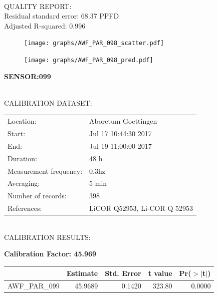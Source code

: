 \documentclass[oneside]{report}
\begin{document}
\hrulefill\\
QUALITY REPORT:\\
Residual standard error: 68.37 PPFD\\
Adjusted R-squared: 0.996



\begin{figure}[H]
  \centering
  \texttt{[image: graphs/AWF\_PAR\_098\_scatter.pdf]}
\end{figure}




\begin{figure}[H]
  \centering
  \texttt{[image: graphs/AWF\_PAR\_098\_pred.pdf]}
\end{figure}

\pagebreak


\begin{center}
\large{\textbf{SENSOR:099}}\\
\end{center}

\hrulefill\\
CALIBRATION DATASET:\\
\begin{table}[h!]
  \centering
  \label{tab:table1}
  \begin{tabular}{ll}
    Location: & Aboretum Goettingen\\ 
    
    
    Start:  & Jul 17 10:44:30 2017 \\
    End:   & Jul 19 11:00:00 2017\\ 
    Duration: & 48 h\\
    Measurement frequency: & 0.3hz\\
    Averaging:  &5 min\\
    Number of records: & 398 \\
    References: & LiCOR Q52953, Li-COR Q 52953 \\
  \end{tabular}
\end{table}

\hrulefill\\
CALIBRATION RESULTS:\\


\begin{center}
\textbf{\large{Calibration Factor: 45.969}}\\
\end{center}
\begin{table}[ht]
\centering
\begin{tabular}{rrrrr}
  \hline
 & Estimate & Std. Error & t value & Pr($>$$|$t$|$) \\ 
  \hline
AWF\_PAR\_099 & 45.9689 & 0.1420 & 323.80 & 0.0000 \\ 
   \hline
\end{tabular}
\end{table}
\end{document}
